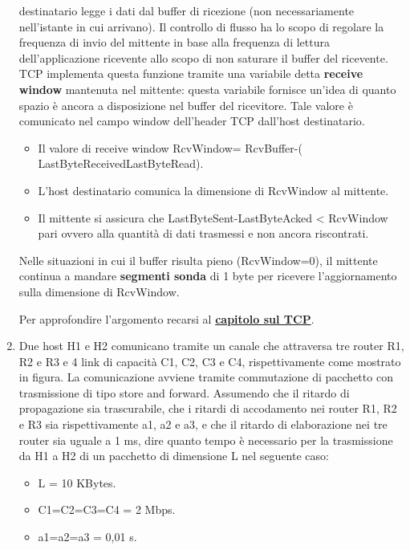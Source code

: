 \documentclass[11pt,a4paper]{article}
\theoremstyle{definition}
\begin{document}
\begin{enumerate}
	      destinatario legge i dati dal buffer di ricezione (non necessariamente nell'istante in cui arrivano). Il controllo di flusso ha lo scopo di regolare la frequenza di invio del mittente in base alla frequenza di lettura
	      dell'applicazione ricevente allo scopo di non saturare il buffer del ricevente.
	      TCP implementa questa funzione tramite una variabile detta \textbf{receive
		      window} mantenuta nel mittente: questa variabile fornisce un'idea di
	      quanto spazio è ancora a disposizione nel buffer del ricevitore. Tale valore
	      è comunicato nel campo window dell'header TCP dall’host destinatario.
	      \begin{itemize}
		      \item Il valore di receive window RcvWindow= RcvBuffer-( LastByteReceivedLastByteRead).
		      \item L'host destinatario comunica la dimensione di RcvWindow al mittente.
		      \item Il mittente si assicura che LastByteSent-LastByteAcked < RcvWindow pari ovvero alla quantità di dati trasmessi e non ancora riscontrati.
	      \end{itemize}
	      Nelle situazioni in cui il buffer risulta pieno (RcvWindow=0), il mittente
	      continua a mandare \textbf{segmenti sonda} di 1 byte per ricevere
	      l’aggiornamento sulla dimensione di RcvWindow.
	      \begin{flushleft}
		      Per approfondire l'argomento recarsi al \hyperref[sec:TCP]{\textbf{capitolo sul TCP}}.
	      \end{flushleft}
	\item Due host H1 e H2 comunicano tramite un canale che attraversa tre router R1, R2 e R3 e 4 link di capacità C1, C2, C3 e C4, rispettivamente come mostrato in figura.
	      La comunicazione avviene tramite commutazione di pacchetto con trasmissione di
	      tipo store and forward. Assumendo che il ritardo di propagazione sia trascurabile, che i ritardi di accodamento nei router R1, R2 e R3 sia rispettivamente a1, a2 e a3, e che il ritardo di elaborazione nei tre router sia uguale a 1 ms, dire quanto tempo è necessario per la trasmissione da H1 a H2 di un pacchetto di dimensione L nel
	      seguente caso:
	      \begin{itemize}
		      \item L = 10 KBytes.
		      \item C1=C2=C3=C4 = 2 Mbps.
		      \item a1=a2=a3 = 0,01 s.
	      \end{itemize}

\end{enumerate}
\end{document}
